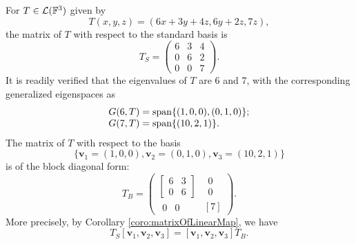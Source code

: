 \begin{exm}
  For $T\in{\cal L}(\mathbb{F}^3)$ given by
  \begin{equation}
    \label{eq:blockMatrixFormExam}
    T(x,y,z) =(6x+3y+4z, 6y+2z, 7z),
  \end{equation}
  the matrix of $T$ with respect to the standard basis is
  \begin{displaymath}
    T_S = \begin{pmatrix}
      6 & 3 & 4
      \\
      0 & 6 & 2
      \\
      0 & 0 & 7
    \end{pmatrix}.
  \end{displaymath}
  It is readily verified that
  the eigenvalues of $T$ are 6 and 7, with
  the corresponding generalized eigenspaces as
  \begin{displaymath}
    \begin{array}{l}
      G(6,T) = \mathrm{span}\{(1,0,0),(0,1,0)\};
      \\
      G(7,T) = \mathrm{span}\{(10,2,1)\}.
    \end{array}
  \end{displaymath}
  The matrix of $T$ with respect to the basis
  \begin{displaymath}
    \{\mathbf{v}_1=(1,0,0), 
    \mathbf{v}_2=(0,1,0), 
    \mathbf{v}_3=(10,2,1)\}
  \end{displaymath}
  is of the block diagonal form:
  \begin{displaymath}
    T_B = 
    \left(
      \begin{array}{cc}
        \left[
        \begin{array}{cc}
          6 & 3
          \\
          0 & 6
        \end{array}
              \right]
            &
              \begin{array}{c}
                0 \\ 0
              \end{array}
        \\
        \begin{array}{cc}
          0 & 0
        \end{array}
            &
              [7]
      \end{array}
    \right).
  \end{displaymath}
  More precisely,
  by Corollary \ref{coro:matrixOfLinearMap},
  we have
  \begin{displaymath}
    T_S[\mathbf{v}_1, \mathbf{v}_2, \mathbf{v}_3] = [\mathbf{v}_1, \mathbf{v}_2, \mathbf{v}_3]T_B.
  \end{displaymath}
\end{exm}

